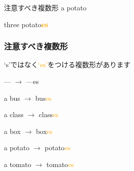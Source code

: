 \documentclass[aspectratio=169,xcolor={dvipsnames,table}]{beamer}
\newcommand{\myaudio}[1]{\href{#1}{\faVolumeUp}}
\begin{document}
\begin{frame}[plain]{注意すべき複数形}
\hspace{15pt}
\pause
{\LARGE a potato} 
\pause

\bigskip

\bigskip

\hspace{15pt}
\pause
{\LARGE three  potato\textcolor{orange}{\bfseries es}}

\myaudio{./audio/005_singular_plural_06.mp3}
\end{frame}
\begin{frame}[plain]\frametitle{注意すべき複数形}

{\Large `s'ではなく\textcolor{orange}{`es'}をつける複数形があります}
\pause

\bigskip

\begin{block}{--- $\rightarrow$ ---es}

a bus \pause$\longrightarrow$ bus\textcolor{orange}{es}\pause%
\hfill{}\hspace*{250pt}\pause

a class \pause$\longrightarrow$ class\textcolor{orange}{es}\pause
\hfill{}\hspace*{250pt}\pause

a box \pause $\longrightarrow$ box\textcolor{orange}{es}\pause
\hfill{}\hspace*{250pt}\pause

a potato \pause$\longrightarrow$ potato\textcolor{orange}{es}\pause
\hfill{}\hspace*{250pt}\pause

a tomato \pause$\longrightarrow$ tomato\textcolor{orange}{es}\pause
\hfill{}\hspace*{250pt}


\end{block}
\end{frame}
\end{document}
